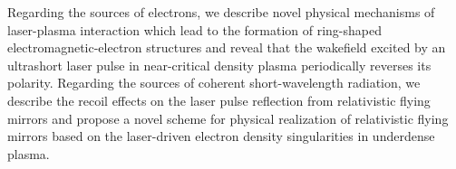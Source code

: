 \documentclass[10pt, a4paper, twoside, openright]{report}
\begin{document}
Regarding the sources of electrons, we describe novel physical mechanisms of laser-plasma interaction which lead to the formation of ring-shaped electromagnetic-electron structures and reveal that the wakefield excited by an ultrashort laser pulse in near-critical density plasma periodically reverses its polarity. Regarding the sources of coherent short-wavelength radiation, we describe the recoil effects on the laser pulse reflection from relativistic flying mirrors and propose a novel scheme for physical realization of relativistic flying mirrors based on the laser-driven electron density singularities in underdense plasma. \\




\clearpage
\pagestyle{myfancy}
\tableofcontents



\end{document}
